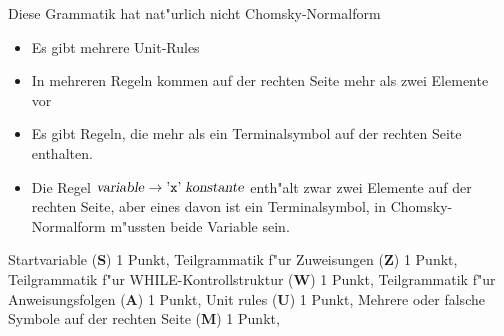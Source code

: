 \begin{loesung}
Diese Grammatik hat nat"urlich nicht Chomsky-Normalform
\begin{itemize}
\item Es gibt mehrere Unit-Rules
\item In mehreren Regeln kommen auf der rechten Seite mehr als
zwei Elemente vor
\item Es gibt Regeln, die mehr als ein Terminalsymbol auf der rechten
Seite enthalten.
\item Die Regel
$\text{\textsl{variable}}\to \text{'{\tt x}'}\;\text{\textsl{konstante}}$
enth"alt zwar zwei Elemente auf der rechten Seite, aber eines davon
ist ein Terminalsymbol, in Chomsky-Normalform m"ussten beide Variable
sein.
\end{itemize}
\end{loesung}

\begin{bewertung}
Startvariable ({\bf S}) 1 Punkt,
Teilgrammatik f"ur Zuweisungen ({\bf Z}) 1 Punkt,
Teilgrammatik f"ur WHILE-Kontrollstruktur ({\bf W}) 1 Punkt,
Teilgrammatik f"ur Anweisungsfolgen ({\bf A}) 1 Punkt,
Unit rules ({\bf U}) 1 Punkt,
Mehrere oder falsche Symbole auf der rechten Seite ({\bf M}) 1 Punkt,
\end{bewertung}
